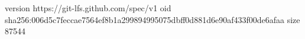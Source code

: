 version https://git-lfs.github.com/spec/v1
oid sha256:006d5c7feccae7564ef8b1a299894995075dbff0d881d6e90af433f00de6afaa
size 87544
